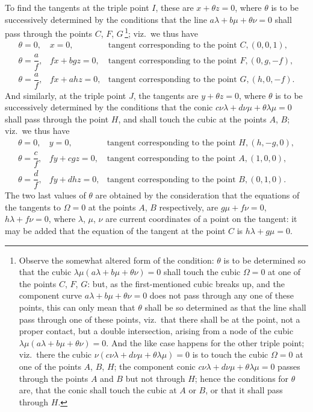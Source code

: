 \documentclass[11pt]{article}
\begin{document}
To find the tangents at the triple point $I$, these are $x + \theta z = 0$, where $\theta$ is to be successively determined by the conditions that the line $a\lambda + b\mu + \theta\nu = 0$ shall pass through the points $C$, $F$, $G$\,\footnote{Observe the somewhat altered form of the condition: $\theta$ is to be determined so that the cubic $\lambda\mu(a\lambda + b\mu + \theta\nu) = 0$ shall touch the cubic $\Omega = 0$ at one of the points $C$, $F$, $G$: but, as the first-mentioned cubic breaks up, and the component curve $a\lambda + b\mu + \theta\nu = 0$ does not pass through any one of these points, this can only mean that $\theta$ shall be so determined as that the line shall pass through one of these points, viz.\ that there shall be at the point, not a proper contact, but a double intersection, arising from a node of the cubic $\lambda\mu(a\lambda + b\mu + \theta\nu) = 0$. And the like case happens for the other triple point; viz.\ there the cubic $\nu(c\nu\lambda + d\nu\mu + \theta\lambda\mu) = 0$ is to touch the cubic $\Omega = 0$ at one of the points $A$, $B$, $H$; the component conic $c\nu\lambda + d\nu\mu + \theta\lambda\mu = 0$ passes through the points $A$ and $B$ but not through $H$; hence the conditions for $\theta$ are, that the conic shall touch the cubic at $A$ or $B$, or that it shall pass through $H$.}; viz.\ we thus have
\[
\begin{array}{lll}
\theta = 0, & x = 0, & \text{tangent corresponding to the point } C, (0,0,1),\\
\theta = \dfrac{a}{f}, & fx + bgz = 0, & \text{tangent corresponding to the point } F, (0, g, -f),\\
\theta = \dfrac{a}{f}, & fx + ahz = 0, & \text{tangent corresponding to the point } G, (h, 0, -f).
\end{array}
\]
And similarly, at the triple point $J$, the tangents are $y + \theta z = 0$, where $\theta$ is to be successively determined by the conditions that the conic $c\nu\lambda + d\nu\mu + \theta\lambda\mu = 0$ shall pass through the point $H$, and shall touch the cubic at the points $A$, $B$; viz.\ we thus have
\[
\begin{array}{lll}
\theta = 0, & y = 0, & \text{tangent corresponding to the point } H, (h, -g, 0),\\
\theta = \dfrac{c}{f}, & fy + cgz = 0, & \text{tangent corresponding to the point } A, (1, 0, 0),\\
\theta = \dfrac{d}{f}, & fy + dhz = 0, & \text{tangent corresponding to the point } B, (0, 1, 0).
\end{array}
\]
The two last values of $\theta$ are obtained by the consideration that the equations of the tangents to $\Omega = 0$ at the points $A$, $B$ respectively, are $g\mu + f\nu = 0$, $h\lambda + f\nu = 0$, where $\lambda$, $\mu$, $\nu$ are current coordinates of a point on the tangent: it may be added that the equation of the tangent at the point $C$ is $h\lambda + g\mu = 0$.
\end{document}
